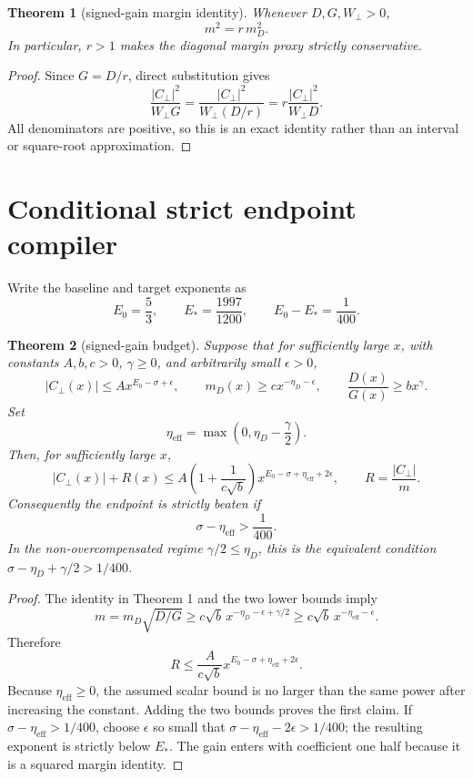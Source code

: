 \documentclass[11pt]{article}
\newcommand{\Cperp}{C_{\perp}}
\newcommand{\Wperp}{W_{\perp}}
\newcommand{\Dpack}{D}
\newcommand{\Gpack}{G}
\newcommand{\md}{m_D}
\newcommand{\meff}{\eta_{\mathrm{eff}}}
\newtheorem{theorem}{Theorem}
\begin{document}
\begin{theorem}[signed-gain margin identity]
Whenever \(\Dpack,\Gpack,\Wperp>0\),
\[
 m^2=r\,\md^2.
\]
In particular, \(r>1\) makes the diagonal margin proxy strictly
conservative.
\end{theorem}

\begin{proof}
Since \(\Gpack=\Dpack/r\), direct substitution gives
\[
 \frac{|\Cperp|^2}{\Wperp\Gpack}
 =\frac{|\Cperp|^2}{\Wperp(\Dpack/r)}
 =r\frac{|\Cperp|^2}{\Wperp\Dpack}.
\]
All denominators are positive, so this is an exact identity rather than an
interval or square-root approximation.
\end{proof}

\section{Conditional strict endpoint compiler}

Write the baseline and target exponents as
\[
 E_0=\frac53,\qquad E_*=\frac{1997}{1200},\qquad
 E_0-E_* = \frac1{400}.
\]

\begin{theorem}[signed-gain budget]
Suppose that for sufficiently large \(x\), with constants \(A,b,c>0\),
\(\gamma\geq0\), and arbitrarily small \(\epsilon>0\),
\[
 |\Cperp(x)|\leq A x^{E_0-\sigma+\epsilon},\qquad
 m_D(x)\geq c x^{-\eta_D-\epsilon},\qquad
 \frac{\Dpack(x)}{\Gpack(x)}\geq b x^\gamma.
\]
Set
\[
 \meff=\max\left(0,\eta_D-\frac\gamma2\right).
\]
Then, for sufficiently large \(x\),
\[
 |\Cperp(x)|+R(x)
 \leq A\left(1+\frac1{c\sqrt b}\right)
 x^{E_0-\sigma+\meff+2\epsilon},
 \qquad R=\frac{|\Cperp|}{m}.
\]
Consequently the endpoint is strictly beaten if
\[
 \sigma-\meff>\frac1{400}.
\]
In the non-overcompensated regime \(\gamma/2\leq\eta_D\), this is the
equivalent condition \(\sigma-\eta_D+\gamma/2>1/400\).
\end{theorem}

\begin{proof}
The identity in Theorem 1 and the two lower bounds imply
\[
 m=m_D\sqrt{\Dpack/\Gpack}
 \geq c\sqrt b\,x^{-\eta_D-\epsilon+\gamma/2}
 \geq c\sqrt b\,x^{-\meff-\epsilon}.
\]
Therefore
\[
 R\leq \frac{A}{c\sqrt b}
 x^{E_0-\sigma+\meff+2\epsilon}.
\]
Because \(\meff\geq0\), the assumed scalar bound is no larger than the same
power after increasing the constant.  Adding the two bounds proves the first
claim.  If \(\sigma-\meff>1/400\), choose \(\epsilon\) so small that
\(\sigma-\meff-2\epsilon>1/400\); the resulting exponent is strictly below
\(E_*\).  The gain enters with coefficient one half because it is a squared
margin identity.\end{proof}
\end{document}
